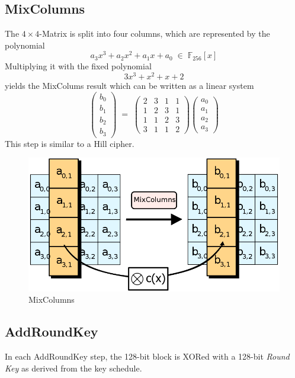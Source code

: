\documentclass[a4paper]{scrartcl}
\newcommand\F{\mathbb F}
\begin{document}
\subsection{MixColumns}

The $4\times4$-Matrix is split into four columns, which are represented by the polynomial
\[a_3x^3 + a_2x^2 + a_1x + a_0\;\in\;\F_{256}[x]\]
Multiplying it with the fixed polynomial
\[3x^3 + x^2 + x + 2\]
yields the MixColums result which can be written as a linear system
\[\begin{pmatrix}
    b_0\\b_1\\b_2\\b_3
\end{pmatrix}\;=\;\begin{pmatrix}
    2 & 3 & 1 & 1 \\
    1 & 2 & 3 & 1 \\
    1 & 1 & 2 & 3 \\
    3 & 1 & 1 & 2
\end{pmatrix}\begin{pmatrix} 
    a_0\\a_1\\a_2\\a_3
\end{pmatrix}\]
This step is similar to a Hill cipher.

\begin{figure}
    \centering
    \includegraphics[scale=0.25]{images/mixcolumns.png}
    \caption{MixColumns}
\end{figure}

\subsection{AddRoundKey}

In each AddRoundKey step, the 128-bit block is XORed with a 128-bit \textit{Round Key} as
derived from the key schedule.
\end{document}
